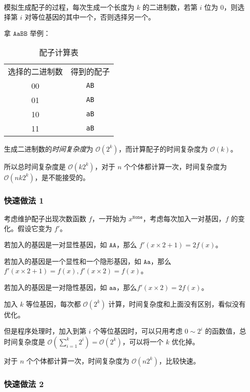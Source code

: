 \documentclass{article}
\begin{document}
模拟生成配子的过程，每次生成一个长度为 $k$ 的二进制数，若第 $i$ 位为 $0$，则选择第 $i$ 对等位基因的其中一个，否则选择另一个。

拿 $\texttt{AaBB}$ 举例：

\begin{table}[htbp]
    \centering
    \caption{配子计算表}
    \begin{tabular}{|c|c|}
        选择的二进制数 & 得到的配子 \\
        00 & \texttt{AB} \\
        01 & \texttt{AB} \\
        10 & \texttt{aB} \\
        11 & \texttt{aB} \\
    \end{tabular}
\end{table}

生成二进制数的\textsl{时间复杂度}为 $\mathcal O(2^k)$，而计算配子的时间复杂度为 $\mathcal O(k)$。

所以总时间复杂度是 $\mathcal O(k 2^k)$，对于 $n$ 个个体都计算一次，时间复杂度为 $\mathcal O(nk 2^k)$，是不能接受的。

\subsubsection*{快速做法 1}

考虑维护配子出现次数函数 $f$，一开始为 $x^{\texttt{None}}$，考虑每次加入一对基因，$f$ 的变化。假设它变为 $f'$。

若加入的基因是一对显性基因，如 $\texttt{AA}$，那么 $f'(x \times 2 + 1)=2f(x)$。

若加入的基因是一个显性和一个隐形基因，如 $\texttt{Aa}$，那么 $f'(x \times 2 + 1)=f(x),f'(x \times 2)=f(x)$。

若加入的基因是一对隐性基因，如 $\texttt{aa}$，那么$f'(x \times 2)=2f(x)$。

加入 $k$ 等位基因，每次都 $\mathcal O(2^k)$ 计算，时间复杂度和上面没有区别，看似没有优化。

但是程序处理时，加入到第 $i$ 个等位基因时，可以只用考虑 $0 \sim 2^i$ 的函数值，总时间复杂度是 $\mathcal O(\sum_{i=1}^k 2^i)=\mathcal O(2^k)$，可以将一个 $k$ 优化掉。

对于 $n$ 个个体都计算一次，时间复杂度为 $\mathcal O(n2^k)$，比较快速。

\newpage

\subsubsection*{快速做法 2}
\end{document}
